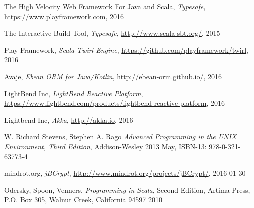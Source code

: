 \documentclass[12pt,twoside,a4paper]{report}
\begin{document}
\begin{thebibliography}{99}
The High Velocity Web Framework For Java and Scala,
\emph{Typesafe},
\url{https://www.playframework.com},
2016

The Interactive Build Tool,
\emph{Typesafe},
\url{http://www.scala-sbt.org/},
2015

Play Framework,
\emph{Scala Twirl Engine},
\url{https://github.com/playframework/twirl},
2016

Avaje,
\emph{Ebean ORM for Java/Kotlin},
\url{http://ebean-orm.github.io/},
2016

LightBend Inc,
\emph{LightBend Reactive Platform},
\url{https://www.lightbend.com/products/lightbend-reactive-platform},
2016

Lightbend Inc,
\emph{Akka},
\url{http://akka.io},
2016

W. Richard Stevens, Stephen A. Rago
\emph{Advanced Programming in the UNIX Environment, Third Edition},
Addison-Wesley
2013 May, ISBN-13: 978-0-321-63773-4

mindrot.org,
\emph{jBCrypt},
\url{http://www.mindrot.org/projects/jBCrypt/},
2016-01-30

Odersky, Spoon, Venners,
\emph{Programming in Scala},
Second Edition,
Artima Press, P.O. Box 305, Walnut Creek, California 94597
2010

\end{thebibliography}
\end{document}
